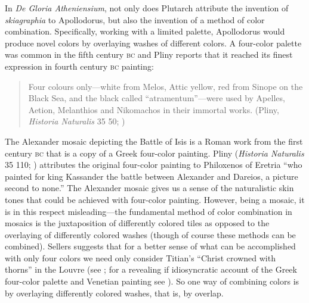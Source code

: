 In \emph{De Gloria Atheniensium}, not only does Plutarch attribute the invention of \emph{skiagraphia} to Apollodorus, but also the invention of a method of color combination. Specifically, working with a limited palette, Apollodorus would produce novel colors by overlaying washes of different colors. A four-color palette was common in the fifth century \textsc{bc} and  Pliny reports that it reached its finest expression in fourth century \textsc{bc} painting:
\begin{quote}
	Four colours only---white from Melos, Attic yellow, red from Sinope on the Black Sea, and the black called ``atramentum''---were used by Apelles, Aetion, Melanthios and Nikomachos in their immortal works. (Pliny, \emph{Historia Naturalis} 35 50; \citealt[97]{Jex-Blake:1896uq})
\end{quote}
The Alexander mosaic depicting the Battle of Isis is a Roman work from the first century \textsc{bc} that is a copy of a Greek four-color painting. Pliny (\emph{Historia Naturalis} 35 110; \citealt[143]{Jex-Blake:1896uq}) attributes the original four-color painting to Philoxenos of Eretria ``who painted for king Kassander the battle between Alexander and Dareios, a picture second to none.'' The Alexander mosaic gives us a sense of the naturalistic skin tones that could be achieved with four-color painting. However, being a mosaic, it is in this respect misleading---the fundamental method of color combination in mosaics is the juxtaposition of differently colored tiles as opposed to the overlaying of differently colored washes (though of course these methods can be combined). Sellers suggests that for a better sense of what can be accomplished with only four colors we need only consider Titian's ``Christ crowned with thorns'' in the Louvre (see \citealt[97 note]{Jex-Blake:1896uq}; for a revealing if idiosyncratic account of the Greek four-color palette and Venetian painting see \citealt{Pavey:1956fk}). So one way of combining colors is by overlaying differently colored washes, that is, by overlap.

